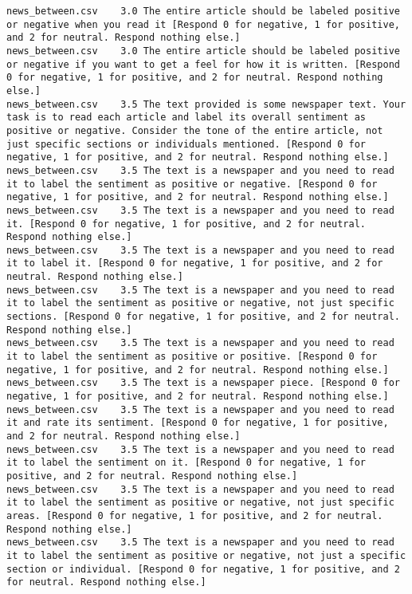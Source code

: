 \begin{lstlisting}[label=lst:promptvariants]
news_between.csv	3.0	The entire article should be labeled positive or negative when you read it [Respond 0 for negative, 1 for positive, and 2 for neutral. Respond nothing else.]
news_between.csv	3.0	The entire article should be labeled positive or negative if you want to get a feel for how it is written. [Respond 0 for negative, 1 for positive, and 2 for neutral. Respond nothing else.]
news_between.csv	3.5	The text provided is some newspaper text. Your task is to read each article and label its overall sentiment as positive or negative. Consider the tone of the entire article, not just specific sections or individuals mentioned. [Respond 0 for negative, 1 for positive, and 2 for neutral. Respond nothing else.]
news_between.csv	3.5	The text is a newspaper and you need to read it to label the sentiment as positive or negative. [Respond 0 for negative, 1 for positive, and 2 for neutral. Respond nothing else.]
news_between.csv	3.5	The text is a newspaper and you need to read it. [Respond 0 for negative, 1 for positive, and 2 for neutral. Respond nothing else.]
news_between.csv	3.5	The text is a newspaper and you need to read it to label it. [Respond 0 for negative, 1 for positive, and 2 for neutral. Respond nothing else.]
news_between.csv	3.5	The text is a newspaper and you need to read it to label the sentiment as positive or negative, not just specific sections. [Respond 0 for negative, 1 for positive, and 2 for neutral. Respond nothing else.]
news_between.csv	3.5	The text is a newspaper and you need to read it to label the sentiment as positive or positive. [Respond 0 for negative, 1 for positive, and 2 for neutral. Respond nothing else.]
news_between.csv	3.5	The text is a newspaper piece. [Respond 0 for negative, 1 for positive, and 2 for neutral. Respond nothing else.]
news_between.csv	3.5	The text is a newspaper and you need to read it and rate its sentiment. [Respond 0 for negative, 1 for positive, and 2 for neutral. Respond nothing else.]
news_between.csv	3.5	The text is a newspaper and you need to read it to label the sentiment on it. [Respond 0 for negative, 1 for positive, and 2 for neutral. Respond nothing else.]
news_between.csv	3.5	The text is a newspaper and you need to read it to label the sentiment as positive or negative, not just specific areas. [Respond 0 for negative, 1 for positive, and 2 for neutral. Respond nothing else.]
news_between.csv	3.5	The text is a newspaper and you need to read it to label the sentiment as positive or negative, not just a specific section or individual. [Respond 0 for negative, 1 for positive, and 2 for neutral. Respond nothing else.]

\end{lstlisting}
